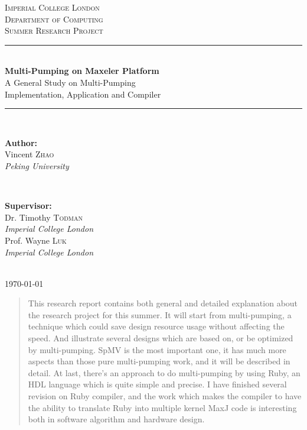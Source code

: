 \documentclass[a4paper, 10pt]{report}
\begin{document}
\begin{titlepage}

\newcommand{\HRule}{\rule{\linewidth}{0.5mm}} 
\center
 
\textsc{\LARGE Imperial College London}\\[1.5cm] %
\textsc{\Large Department of Computing}\\[0.5cm] %
\textsc{\large Summer Research Project}\\[0.5cm] %

\HRule \\[0.4cm]
{ \LARGE 
  \textbf{Multi-Pumping on Maxeler Platform} \\[0.2cm]
  \large A General Study on Multi-Pumping\\ Implementation, Application and Compiler }\\[0.3cm] %
\HRule \\[1.5cm]
 
\begin{minipage}[t]{0.4\textwidth}
\begin{flushleft}
\textbf{Author:}\\
Vincent \textsc{Zhao}\\ %
\emph{Peking University}
\end{flushleft}
\vfill
\end{minipage}
~
\begin{minipage}[t]{0.4\textwidth}
\begin{flushright}
\textbf{Supervisor:} \\
Dr. Timothy \textsc{Todman} \\%
\emph{Imperial College London} \\[0.2cm]
Prof. Wayne \textsc{Luk}\\
\emph{Imperial College London}
\end{flushright}
\vfill
\end{minipage}\\[2cm]

{\large \today}\\[2cm]

\vfill %
\end{titlepage}

\begin{abstract}
This research report contains both general and detailed explanation about the research project for this summer. It will start from multi-pumping, a technique which could save design resource usage without affecting the speed. And illustrate several designs which are based on, or be optimized by multi-pumping. SpMV is the most important one, it has much more aspects than those pure multi-pumping work, and it will be described in detail. At last, there's an approach to do multi-pumping by using Ruby, an HDL language which is quite simple and precise. I have finished several revision on Ruby compiler, and the work which makes the compiler to have the ability to translate Ruby into multiple kernel MaxJ code is interesting both in software algorithm and hardware design.
\end{abstract}
\newpage
\end{document}
